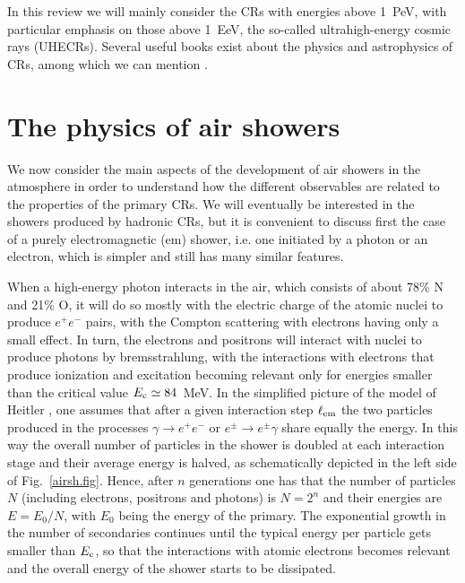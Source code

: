 \documentclass[twoside,12pt]{article}
\begin{document}
In this review we will mainly consider the CRs with energies above 1~PeV, with particular emphasis on those above  1~EeV, the so-called ultrahigh-energy cosmic rays (UHECRs). Several useful books  exist about the physics and astrophysics of CRs, among which we can mention \cite{berezinsky,gaisser}.

\section{The physics of air showers}

We now consider the main aspects of the development of air showers in the atmosphere in order to understand how the different observables are related to the properties of the primary CRs. 
We will eventually be interested in the showers produced by hadronic CRs, but it is convenient to discuss first the case of a purely electromagnetic (em) shower, i.e. one initiated by a photon or an electron, which is simpler and still has many similar features.

When a high-energy photon interacts in the air, which consists of about 78\% N and 21\% O, it will do so mostly with the electric charge of the atomic nuclei to produce $e^+e^-$ pairs, with the Compton scattering with electrons having only a small effect. In turn, the electrons and positrons will interact with nuclei
to produce photons by bremsstrahlung, with the interactions with electrons that produce ionization and excitation becoming relevant only for energies smaller than the critical value $E_{\rm c}\simeq 84$~MeV. In the simplified picture of the model of Heitler \cite{heitler}, one assumes that after a given interaction step $\ell_{\rm em}$ the two particles produced in the processes $\gamma\to e^+e^-$ or $e^\pm \to e^\pm \gamma$ share equally the energy. In this way the overall number of particles in the shower is doubled at each interaction stage and their average energy is halved, as schematically depicted in the left side of Fig.~\ref{airsh.fig}. Hence, after $n$ generations one has that the number of particles $N$ (including electrons, positrons and photons) is $N=2^n$ and their energies are $E=E_0/N$, with $E_0$ being the energy of the primary. The exponential growth in the number of secondaries continues until the typical energy per particle gets smaller than $E_{\rm c}$, so that the interactions with atomic electrons becomes relevant and the overall energy of the shower starts  to be dissipated.
\end{document}
